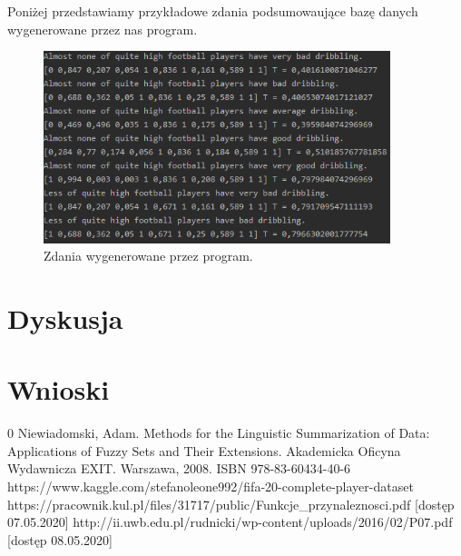 \documentclass{classrep}
\begin{document}
	Poniżej przedstawiamy przykładowe zdania podsumowaujące bazę danych wygenerowane przez nas program.
	\begin{figure}[h!]
		\centering
		\includegraphics[width=0.9\textwidth]{zdania1.png}
		\caption{Zdania wygenerowane przez program.}
		\label{zdania}
	\end{figure}
	
	\section{Dyskusja} %
	
	\section{Wnioski}
	

	
	\begin{thebibliography} {0}
		 Niewiadomski, Adam. Methods for the Linguistic Summarization of Data: Applications of Fuzzy Sets and Their Extensions. Akademicka Oficyna Wydawnicza EXIT. Warszawa, 2008. ISBN 978-83-60434-40-6
		 https://www.kaggle.com/stefanoleone992/fifa-20-complete-player-dataset 
		 https://pracownik.kul.pl/files/31717/public/Funkcje\_przynaleznosci.pdf [dostęp 07.05.2020]
		 http://ii.uwb.edu.pl/rudnicki/wp-content/uploads/2016/02/P07.pdf [dostęp 08.05.2020]
	\end{thebibliography}
\end{document}
